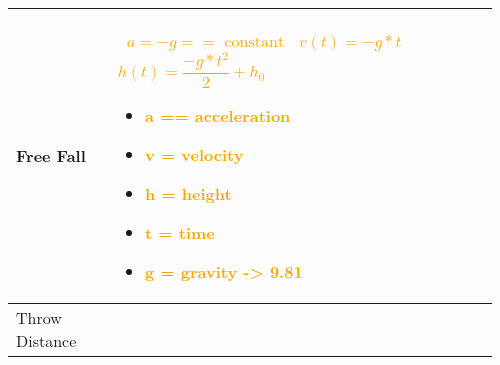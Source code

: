 \documentclass[main.tex,fontsize=8pt,paper=a4,paper=portrait,DIV=calc,]{scrartcl}
\begin{document}
\begin{table}[ht!]
\begin{tabular}{|m{0.2\linewidth}|m{0.755\linewidth}|}
\hline
Free Fall & 
\, \newline
\huge \textcolor{orange}{\( a = -g == \text{ constant} \)}\newline
\, \newline
\huge \textcolor{orange}{\(v(t) = -g * t\)}\newline
\, \newline
\huge \textcolor{orange}{\(h(t) = \dfrac{-g * t^2}{2} + h_0\)}\newline
\, \newline \normalsize
\begin{itemize}
\item \textcolor{orange}{a == acceleration}
\item \textcolor{orange}{v = velocity}
\item \textcolor{orange}{h = height}
\item \textcolor{orange}{t = time}
\item \textcolor{orange}{g = gravity -> 9.81}
\end{itemize} 
\\
\hline
Throw Distance & 

\\

\hline
\end{tabular}
\end{table}
\end{document}
